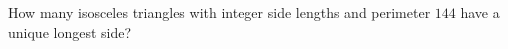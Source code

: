 How many isosceles triangles with integer side lengths and perimeter $144$ have a unique longest side?
